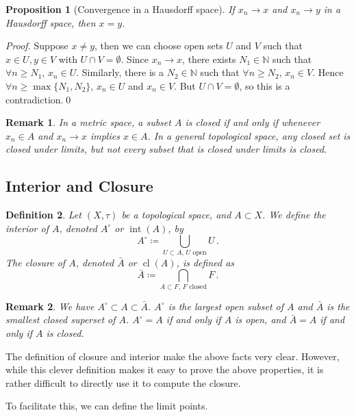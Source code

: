 \documentclass{article}
\theoremstyle{plain}\theoremheaderfont{\normalfont\itshape}\theorembodyfont{\rmfamily}\theoremseparator{.}\newtheorem*{rem}{Remark}\newtheorem*{ex}{Example}\newtheorem*{proof}{Proof}\newtheorem*{altp}{Alternative proof}
\theoremstyle{plain}\theoremheaderfont{\normalfont\bfseries}\theorembodyfont{\rmfamily}\theoremseparator{.}\newtheorem{thm}{Theorem}[section]\newtheorem{lem}[thm]{Lemma}\newtheorem{prop}[thm]{Proposition}\newtheorem*{cor}{Corollary}\newtheorem{defn}[thm]{Definition}\newtheorem{clm}[thm]{Claim}\newtheorem{clminproof}{Claim}
\theoremstyle{break}\theoremheaderfont{\normalfont\itshape}\theorembodyfont{\rmfamily}\theoremseparator{.\medskip}\newtheorem*{proofskip}{Proof}\newtheorem*{exs}{Examples}\newtheorem*{rems}{Remarks}
\theoremstyle{break}\theoremheaderfont{\normalfont\bfseries}\theorembodyfont{\rmfamily}\theoremseparator{.\medskip}\newtheorem{lemskip}[thm]{Lemma}\newtheorem{defnskip}[thm]{Definition}\newtheorem{propskip}[thm]{Proposition}\newtheorem{thmskip}[thm]{Theorem}
\newcommand{\qed}{\hfill\ensuremath{\Box}}
\DeclareMathOperator{\cl}{cl}
\DeclareMathOperator{\inter}{int}
\begin{document}
    \begin{prop}[Convergence in a Hausdorff space]
        If \(x_n\to x\) and \(x_n\to y\) in a Hausdorff space, then \(x=y\).
    \end{prop}
    \begin{proof}
        Suppose \(x\ne y\), then we can choose open sets \(U\) and \(V\) such that \(x\in U,y\in V\) with \(U\cap V=\emptyset\). Since \(x_n\to x\), there exists \(N_1\in\mathbb{N}\) such that \(\forall n\ge N_1\), \(x_n\in U\). Similarly, there is a \(N_2\in\mathbb{N}\) such that \(\forall n\ge N_2\), \(x_n\in V\). Hence \(\forall n\ge\max\{N_1,N_2\}\), \(x_n\in U\) and \(x_n\in V\). But \(U\cap V=\emptyset\), so this is a contradiction.\qed 
    \end{proof}
    \begin{rem}
        In a metric space, a subset \(A\) is closed if and only if whenever \(x_n\in A\) and \(x_n\to x\) implies \(x\in A\). In a general topological space, any closed set is closed under limits, but not every subset that is closed under limits is closed.
    \end{rem}

    \subsection{Interior and Closure}
    \begin{defn}
        Let \((X,\tau)\) be a topological space, and \(A\subset X\). We define the \textit{interior} of \(A\), denoted \(A^\circ\) or \(\inter(A)\), by
        \[A^\circ\coloneqq\bigcup_{U\subset A,\, U\text{ open}} U\,.\]
        The \textit{closure} of \(A\), denoted \(\bar{A}\) or \(\cl(A)\), is defined as
        \[\bar{A}\coloneqq\bigcap_{A\subset F,\, F\text{ closed}}F\,.\]
    \end{defn}
    \begin{rem}
        We have \(A^\circ\subset A\subset \bar{A}\). \(A^\circ\) is the largest open subset of \(A\) and \(\bar{A}\) is the smallest closed superset of \(A\). \(A^\circ=A\) if and only if \(A\) is open, and \(\bar{A}=A\) if and only if \(A\) is closed.
    \end{rem}

    The definition of closure and interior make the above facts very clear. However, while this clever definition makes it easy to prove the above properties, it is rather difficult to directly use it to compute the closure.

    To facilitate this, we can define the limit points.
\end{document}
